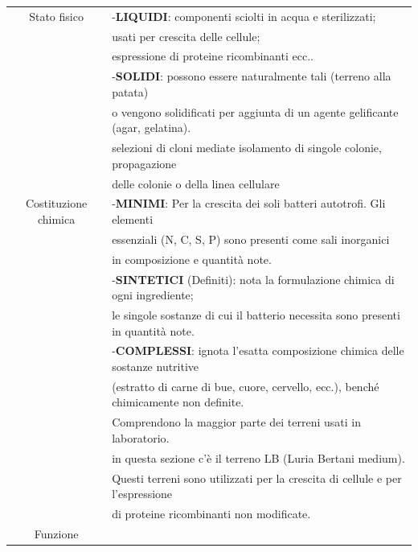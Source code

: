 \begin{tabular}{ll}
\hline
\multicolumn{1}{c}{Stato fisico}

& -\textbf{LIQUIDI}: componenti sciolti in acqua e sterilizzati; \\
\cline{1-1} &usati per crescita delle cellule;\\
&  espressione di proteine ricombinanti ecc..\\

& -\textbf{SOLIDI}:  possono essere naturalmente tali (terreno alla patata)\\
& o vengono solidificati per aggiunta di un agente gelificante (agar, gelatina). \\
&selezioni di cloni mediate isolamento di singole colonie, propagazione \\
& delle colonie o della linea cellulare \\

\hline
\multicolumn{1}{c}{Costituzione chimica}

& -\textbf{MINIMI}: Per la crescita dei soli batteri autotrofi. Gli elementi \\ \cline{1-1}
& essenziali (N, C, S, P) sono presenti come sali inorganici\\
& in composizione e quantità note.\\

& -\textbf{SINTETICI} (Definiti): nota la formulazione chimica di ogni ingrediente; \\
& le singole sostanze di cui il batterio necessita sono presenti in quantità note.\\
& -\textbf{COMPLESSI}: ignota l’esatta composizione chimica delle sostanze nutritive \\
& (estratto di carne di bue, cuore, cervello, ecc.), benché chimicamente non definite.\\
& Comprendono la maggior parte dei terreni usati in laboratorio. \\
& in  questa sezione c'è il terreno LB (Luria Bertani medium).\\
&  Questi terreni sono utilizzati per la crescita di cellule e per l’espressione
\\ & di proteine ricombinanti non modificate.\\

\hline
\multicolumn{1}{c}{Funzione}


\end{tabular}
